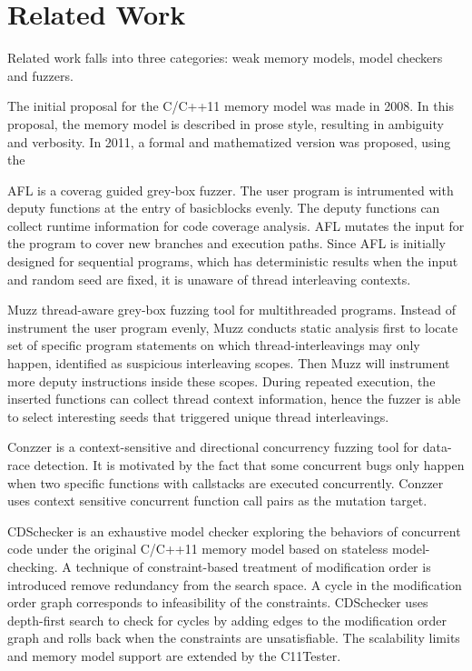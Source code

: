 \chapter{\label{cha:related}Related Work}

Related work falls into three categories: weak memory models, model checkers and fuzzers. 


The initial proposal for the C/C++11 memory model was made in 2008\cite{c++model-proposal}. In this proposal, the memory model is described in prose style, resulting in ambiguity and verbosity. In 2011, a formal and mathematized version was proposed, using the 




AFL\cite{afl} is a coverag guided grey-box fuzzer. The user program is intrumented with deputy functions at the entry of basicblocks evenly. The deputy functions can collect runtime information for code coverage analysis. AFL mutates the input for the program to cover new branches and execution paths. Since AFL is initially designed for sequential programs, which has deterministic results when the input and random seed are fixed, it is unaware of thread interleaving contexts. 

Muzz\cite{muzz} thread-aware grey-box fuzzing tool for multithreaded programs. Instead of instrument the user program evenly, Muzz conducts static analysis first to locate set of specific program statements on which thread-interleavings may only happen, identified as suspicious interleaving scopes. Then Muzz will instrument more deputy instructions inside these scopes. During repeated execution, the inserted functions can collect thread context information, hence the fuzzer is able to select interesting seeds that triggered unique thread interleavings. 

Conzzer\cite{conzzer} is a context-sensitive and directional concurrency fuzzing tool for data-race detection. It is motivated by the fact that some concurrent bugs only happen when two specific functions with callstacks are executed concurrently. Conzzer uses context sensitive concurrent function call pairs as the mutation target. 



CDSchecker\cite{cdschecker} is an exhaustive model checker exploring the behaviors of concurrent code under the original C/C++11 memory model based on stateless model-checking. A technique of constraint-based treatment of modification order is introduced remove redundancy from the search space. A cycle in the modification order graph corresponds to infeasibility of the constraints. CDSchecker uses depth-first search to check for cycles by adding edges to the modification order graph and rolls back when the constraints are unsatisfiable. The scalability limits and memory model support are extended by the C11Tester. 

